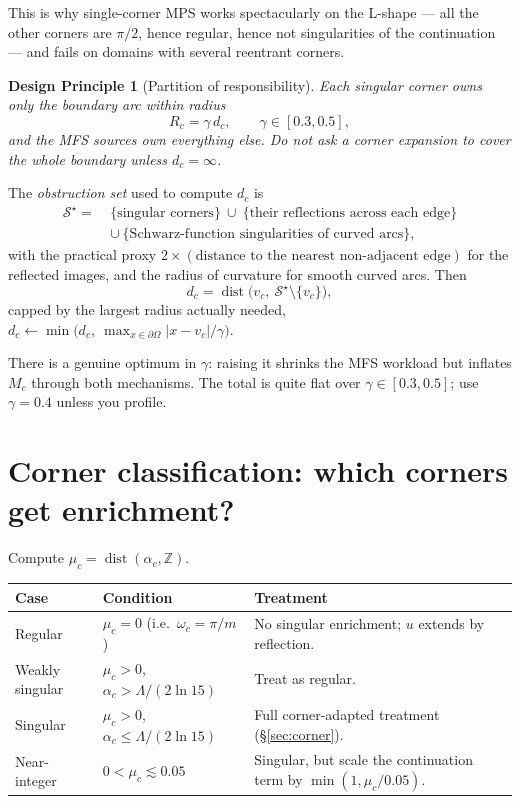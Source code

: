 \documentclass[11pt]{article}
\newtheorem{principle}{Design Principle}
\newcommand{\dist}{\operatorname{dist}}
\newcommand{\Sstar}{\mathcal{S}^\star}
\newcommand{\Z}{\mathbb{Z}}
\begin{document}
This is why single-corner MPS works spectacularly on the L-shape --- all the other
corners are $\pi/2$, hence regular, hence not singularities of the continuation ---
and fails on domains with several reentrant corners.

\begin{principle}[Partition of responsibility]
Each singular corner owns only the boundary arc within radius
\[
  R_c=\gamma\, d_c ,\qquad \gamma\in[0.3,0.5],
\]
and the MFS sources own everything else. Do not ask a corner expansion to cover the
whole boundary unless $d_c=\infty$.
\end{principle}

The \emph{obstruction set} used to compute $d_c$ is
\begin{align*}
  \Sstar=\ &\{\text{singular corners}\}\ \cup\
            \{\text{their reflections across each edge}\}\\
    &\cup\ \{\text{Schwarz-function singularities of curved arcs}\},
\end{align*}
with the practical proxy $2\times(\text{distance to the nearest non-adjacent edge})$
for the reflected images, and the radius of curvature for smooth curved arcs. Then
\[
  d_c=\dist\big(v_c,\ \Sstar\setminus\{v_c\}\big),
\]
capped by the largest radius actually needed,
$d_c\leftarrow\min\big(d_c,\ \max_{x\in\partial\Omega}|x-v_c|/\gamma\big)$.

There is a genuine optimum in $\gamma$: raising it shrinks the MFS workload but
inflates $M_c$ through both mechanisms. The total is quite flat over
$\gamma\in[0.3,0.5]$; use $\gamma=0.4$ unless you profile.

\section{Corner classification: which corners get enrichment?}
\label{sec:classification}

Compute $\mu_c=\dist(\alpha_c,\Z)$.

\begin{center}
\small
\begin{tabular}{@{}p{2.4cm}p{4.0cm}p{7.2cm}@{}}
\toprule
\textbf{Case} & \textbf{Condition} & \textbf{Treatment} \\
\midrule
Regular
  & $\mu_c=0$ (i.e.\ $\omega_c=\pi/m$)
  & No singular enrichment; $u$ extends by reflection. \\[3pt]
Weakly singular
  & $\mu_c>0$, $\alpha_c>\Lambda/(2\ln 15)$
  & Treat as regular. \\[3pt]
Singular
  & $\mu_c>0$, $\alpha_c\le\Lambda/(2\ln 15)$
  & Full corner-adapted treatment (\S\ref{sec:corner}). \\[3pt]
Near-integer
  & $0<\mu_c\lesssim0.05$
  & Singular, but scale the continuation term by
    $\min(1,\mu_c/0.05)$. \\
\bottomrule
\end{tabular}
\end{center}
\end{document}
